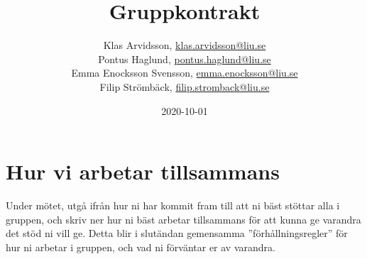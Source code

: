 \documentclass{mall}
\author{Klas Arvidsson, \url{klas.arvidsson@liu.se}\\
  Pontus Haglund, \url{pontus.haglund@liu.se}\\
  Emma Enocksson Svensson, \url{emma.enocksson@liu.se}\\
  Filip Strömbäck, \url{filip.stromback@liu.se}}
\title{Gruppkontrakt}
\date{2020-10-01}
\begin{document}
\projectpage





\section{Hur vi arbetar tillsammans}


Under mötet, utgå ifrån hur ni har kommit fram till att ni bäst stöttar alla i gruppen, och skriv ner hur ni bäst arbetar tillsammans för att kunna ge varandra det stöd ni
vill ge. Detta blir i slutändan gemensamma ''förhållningsregler'' för hur ni arbetar i gruppen, och
vad ni förväntar er av varandra.
\end{document}
